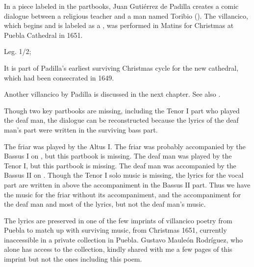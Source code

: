 In a piece labeled  in the partbooks, Juan Gutiérrez de Padilla 
creates a comic dialogue between a religious teacher and a  man 
named Toribio ().
The villancico, which begins  and is labeled as a 
, was performed in Matins for Christmas at Puebla 
Cathedral in 1651.%
    \begin{Footnote}
        \signature{MEX-Pc}{Leg. 1/2}; 
        \autocites{Stanford:Catalog}{Puebla:Microfilm}
    \end{Footnote}
It is part of Padilla's earliest surviving Christmas cycle for the new 
cathedral, which had been consecrated in 1649.%
    \begin{Footnote}
        Another villancico by Padilla is discussed in the next chapter. 
        See also \autocites{Cashner:Cards}{Mauleon:PadillaPalafox}.
    \end{Footnote}
Though two key partbooks are missing, including the Tenor I part who played the 
deaf man, the dialogue can be reconstructed because the lyrics of the deaf 
man's part were written in the surviving bass part.%
\begin{Footnote}
    The friar was played by the Altus I. 
    The friar was probably accompanied by the Bassus I on , but 
    this partbook is missing.
    The deaf man was played by the Tenor I, but this partbook is missing.
    The deaf man was accompanied by the Bassus II on .
    Though the Tenor I solo music is missing, the lyrics for the vocal part are 
    written in above the accompaniment in the Bassus II part. 
    Thus we have the music for the friar without its accompaniment, and the 
    accompaniment for the deaf man and most of the lyrics, but not the deaf man's 
    music.

    The lyrics are preserved in one of the few imprints of villancico poetry 
    from Puebla to match up with surviving music, from Christmas 1651, currently 
    inaccessible in a private collection in Puebla.
    Gustavo Mauleón Rodríguez, who alone has access to the collection, kindly 
    shared with me a few pages of this imprint but not the ones including this 
    poem. %
\end{Footnote}


